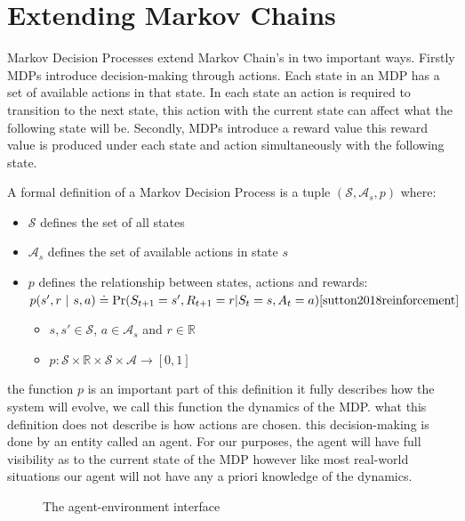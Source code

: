 \documentclass[]{final_report}
\begin{document}
\newpage
\section{Extending Markov Chains}

Markov Decision Processes extend Markov Chain's in two important ways. Firstly MDPs introduce decision-making through actions. Each state in an MDP has a set of available actions in that state. In each state an action is required to transition to the next state, this action with the current state can affect what the following state will be. Secondly, MDPs introduce a reward value this reward value is produced under each state and action simultaneously with the following state.

A formal definition of a Markov Decision Process is a tuple $(\mathcal{S},\mathcal{A}_s,p)$ where:
\begin{itemize}
  \item $\mathcal{S}$ defines the set of all states
  \item $\mathcal{A}_s$ defines the set of available actions in state $s$
  \item $p$ defines the relationship between states, actions and rewards: \\
  $p(s',r\ |\ s,a) \doteq \Pr(S_{t+1} = s', R_{t+1} = r | S_t = s, A_t = a)\cite{sutton2018reinforcement}$
  \begin{itemize}
    \item $s, s' \in \mathcal{S}$, $a \in \mathcal{A}_s$ and $r \in \mathbb{R}$
    \item $p: \mathcal{S} \times \mathbb{R} \times \mathcal{S} \times \mathcal{A} \rightarrow [0,1]$
  \end{itemize}
\end{itemize}

the function $p$ is an important part of this definition it fully describes how the system will evolve, we call this function the dynamics of the MDP. what this definition does not describe is how actions are chosen. this decision-making is done by an entity called an agent. For our purposes, the agent will have full visibility as to the current state of the MDP however like most real-world situations our agent will not have any a priori knowledge of the dynamics. 

\begin{figure}[h]
  \centering
  \fboxsep 2mm
  \caption{\label{fig:agent-enviroment} The agent-environment interface}
\end{figure} 
    
\end{document}

